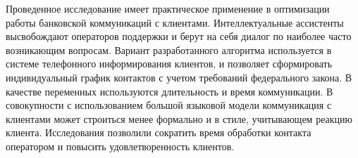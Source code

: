 Проведенное исследование имеет практическое применение в оптимизации работы банковской коммуникаций с клиентами.
Интеллектуальные ассистенты высвобождают операторов поддержки и берут на себя диалог по наиболее часто возникающим
вопросам. Вариант разработанного алгоритма используется в системе телефонного информирования клиентов,
и позволяет сформировать индивидуальный график контактов с учетом требований федерального закона.
В качестве переменных используются длительность и время коммуникации. 
В совокупности с использованием большой языковой модели коммуникация с клиентами может строиться менее
формально и в стиле, учитывающем реакцию клиента. Исследования позволили сократить время
обработки контакта оператором и повысить удовлетворенность клиентов.


